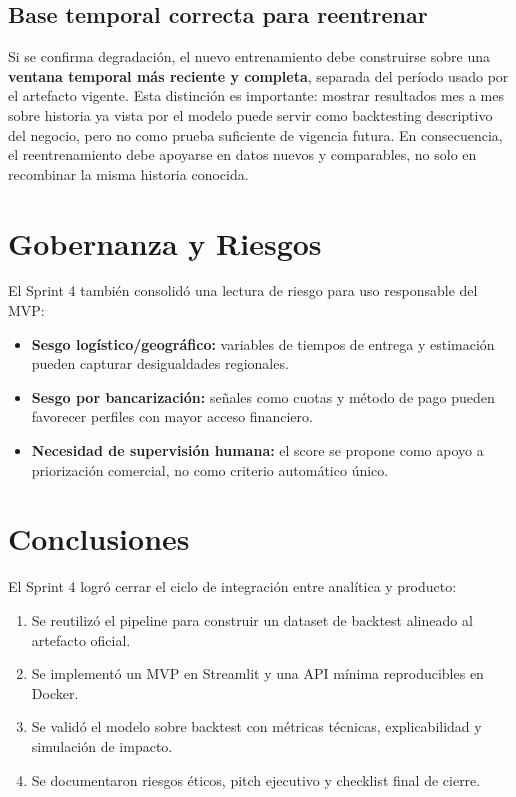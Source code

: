 \documentclass[journal,letterpaper]{IEEEtran}
\begin{document}
\subsection{Base temporal correcta para reentrenar}
Si se confirma degradación, el nuevo entrenamiento debe construirse sobre una \textbf{ventana temporal más reciente y completa}, separada del período usado por el artefacto vigente. Esta distinción es importante: mostrar resultados mes a mes sobre historia ya vista por el modelo puede servir como backtesting descriptivo del negocio, pero no como prueba suficiente de vigencia futura. En consecuencia, el reentrenamiento debe apoyarse en datos nuevos y comparables, no solo en recombinar la misma historia conocida.

\section{Gobernanza y Riesgos}
El Sprint 4 también consolidó una lectura de riesgo para uso responsable del MVP:
\begin{itemize}
    \item \textbf{Sesgo logístico/geográfico:} variables de tiempos de entrega y estimación pueden capturar desigualdades regionales.
    \item \textbf{Sesgo por bancarización:} señales como cuotas y método de pago pueden favorecer perfiles con mayor acceso financiero.
    \item \textbf{Necesidad de supervisión humana:} el score se propone como apoyo a priorización comercial, no como criterio automático único.
\end{itemize}

\section{Conclusiones}
El Sprint 4 logró cerrar el ciclo de integración entre analítica y producto:
\begin{enumerate}
    \item Se reutilizó el pipeline para construir un dataset de backtest alineado al artefacto oficial.
    \item Se implementó un MVP en Streamlit y una API mínima reproducibles en Docker.
    \item Se validó el modelo sobre backtest con métricas técnicas, explicabilidad y simulación de impacto.
    \item Se documentaron riesgos éticos, pitch ejecutivo y checklist final de cierre.
\end{enumerate}
\end{document}
